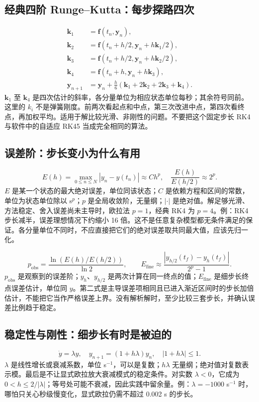 \documentclass[UTF8,zihao=-4,openany,oneside,fontset=windows]{ctexbook}
\begin{document}
\subsection{经典四阶 Runge--Kutta：每步探路四次}
\begin{align}
\boldsymbol k_1&=\boldsymbol f(t_n,\boldsymbol y_n),\\
\boldsymbol k_2&=\boldsymbol f(t_n+h/2,\boldsymbol y_n+h\boldsymbol k_1/2),\\
\boldsymbol k_3&=\boldsymbol f(t_n+h/2,\boldsymbol y_n+h\boldsymbol k_2/2),\\
\boldsymbol k_4&=\boldsymbol f(t_n+h,\boldsymbol y_n+h\boldsymbol k_3),\\
\boldsymbol y_{n+1}&=\boldsymbol y_n+\frac h6(\boldsymbol k_1+2\boldsymbol k_2+2\boldsymbol k_3+\boldsymbol k_4).
\end{align}
$\boldsymbol k_1$ 至 $\boldsymbol k_4$ 是四次估计的斜率，各分量单位为相应状态单位每秒；其余符号同前。这里的 $k_i$ 不是弹簧刚度。前两次看起点和中点，第三次改进中点，第四次看终点，再加权平均。适用于解比较光滑、非刚性的问题。不要把这个固定步长 RK4 与软件中的自适应 RK45 当成完全相同的算法。

\subsection{误差阶：步长变小为什么有用}
\begin{equation}
E(h)=\max_{0\leq n\leq N}|y_n-y(t_n)|\approx C h^p,
\quad \frac{E(h)}{E(h/2)}\approx 2^p.
\end{equation}
$E$ 是某一个状态的最大绝对误差，单位同该状态；$C$ 是依赖方程和区间的常数，单位为状态单位除以 s$^p$；$p$ 是全局收敛阶，无量纲；$|\cdot|$ 是绝对值。解足够光滑、方法稳定、舍入误差尚未主导时，欧拉法 $p=1$，经典 RK4 为 $p=4$。例：RK4 步长减半，误差理想情况下约缩小 16 倍。这不是任意复杂模型都无条件满足的保证。各分量单位不同时，不应直接把它们的绝对误差取共同最大值，应该先归一化。

\begin{equation}
p_{\mathrm{obs}}=\frac{\ln(E(h)/E(h/2))}{\ln 2},\qquad
E_{\mathrm{fine}}\approx\frac{|y_{h/2}(t_f)-y_h(t_f)|}{2^p-1}.
\end{equation}
$p_{\mathrm{obs}}$ 是观察到的误差阶；$y_h$、$y_{h/2}$ 是两次计算在同一终点的值；$E_{\mathrm{fine}}$ 是细步长终点误差估计，单位同 $y$。第二式是主导误差项相同且已进入渐近区间时的步长加倍估计，不能把它当作严格误差上界。没有解析解时，至少比较三套步长，并确认误差比例趋于稳定。

\subsection{稳定性与刚性：细步长有时是被迫的}
\begin{equation}
\dot y=\lambda y,\quad y_{n+1}=(1+h\lambda)y_n,
\quad |1+h\lambda|\leq1.
\end{equation}
$\lambda$ 是线性增长或衰减系数，单位 s$^{-1}$，可以是复数；$h\lambda$ 无量纲；绝对值对复数表示模。最后是不让显式欧拉放大衰减模式的稳定条件。对实数 $\lambda<0$，它成为 $0<h\leq 2/|\lambda|$；等号处可能不衰减，因此实践中留余量。例：$\lambda=-1000$ s$^{-1}$ 时，哪怕只关心秒级慢变化，显式欧拉仍需不超过 0.002 s 的步长。
\end{document}
